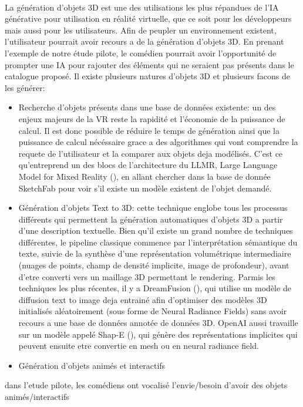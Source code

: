 \paragraph{}
La génération d'objets 3D est une des utilisations les plus répandues de l'IA générative pour utilisation
en réalité virtuelle, que ce soit pour les développeurs mais aussi pour les utilisateurs. 
Afin de peupler un environnement existent, l'utilisateur pourrait avoir recours a de la génération d'objets 3D. 
En prenant l'exemple de notre étude pilote, le comédien pourrait avoir l'opportunité de prompter une IA pour
rajouter des éléments qui ne seraient pas présents dans le catalogue proposé. Il existe plusieurs natures d'objets 
3D et plusieurs facons de les générer:

\begin{itemize}
    \item Recherche d'objets présents dans une base de données existente: un des enjeux majeurs de la VR 
    reste la rapidité et l'économie de la puissance de calcul. Il est donc possible de réduire le temps de génération
    ainsi que la puissance de calcul nécéssaire grace a des algorithmes qui vont comprendre la requete de l'utilisateur
    et la comparer aux objets deja modélisés. C'est ce qu'entreprend un des blocs de l'architecture du LLMR, Large Language Model for Mixed 
    Reality (\cite{delatorre2023llmr}), en allant chercher dans la base de donnée SketchFab pour voir s'il existe un 
    modèle existent de l'objet demandé. 
    \item Génération d'objets Text to 3D: cette technique englobe tous les processus différents qui permettent 
    la génération automatiques d'objets 3D a partir d'une description textuelle. Bien qu'il existe un grand nombre
    de techniques différentes, le pipeline classique commence par l'interprétation sémantique du texte, suivie de la 
    synthèse d'une représentation volumétrique intermediaire (nuages de points, champ de densité implicite, image de profondeur), 
    avant d'etre converti vers un maillage 3D permettant le rendering. Parmis les techniques les plus récentes, il y a DreamFusion
    (\cite{poole2022dreamfusion}), qui utilise un modèle de diffusion text to image deja entrainé afin d'optimiser des modèles 3D initialisés aléatoirement (sous forme de Neural Radiance Fields) sans
    avoir recours a une base de données annotée de données 3D. OpenAI aussi travaille sur un modèle appelé Shap-E (\cite{jun2023shap}), qui génère des représentations
    implicites qui peuvent ensuite etre convertie en mesh ou en neural radiance field. 
    \item Génération d'objets animés et interactifs
\end{itemize}

dans l'etude pilote, les comédiens ont vocalisé l'envie/besoin d'avoir des objets 
animés/interactifs 